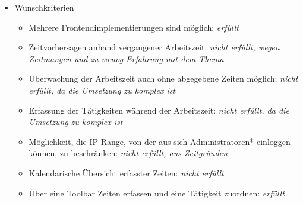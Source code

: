 \begin{itemize}
    
  \item Wunschkriterien
    \begin{itemize}
	    \item Mehrere Frontendimplementierungen sind möglich: \emph{erfüllt}
    	\item Zeitvorhersagen anhand vergangener Arbeitszeit: \emph{nicht erfüllt, wegen Zeitmangen und zu wenog Erfahrung mit dem Thema}
    	\item Überwachung der Arbeitszeit auch ohne abgegebene Zeiten möglich: \emph{nicht erfüllt, da die Umsetzung zu komplex ist} 
    	\item Erfassung der Tätigkeiten während der Arbeitszeit: \emph{nicht erfüllt, da die Umsetzung zu komplex ist}
    	\item Möglichkeit, die IP-Range, von der aus sich Administratoren* einloggen können, zu beschränken: \emph{nicht erfüllt, aus Zeitgründen}
    	\item Kalendarische Übersicht erfasster Zeiten: \emph{nicht erfüllt}
    	\item Über eine Toolbar Zeiten erfassen und eine Tätigkeit zuordnen: \emph{erfüllt}
  \end{itemize}
\end{itemize}



      
